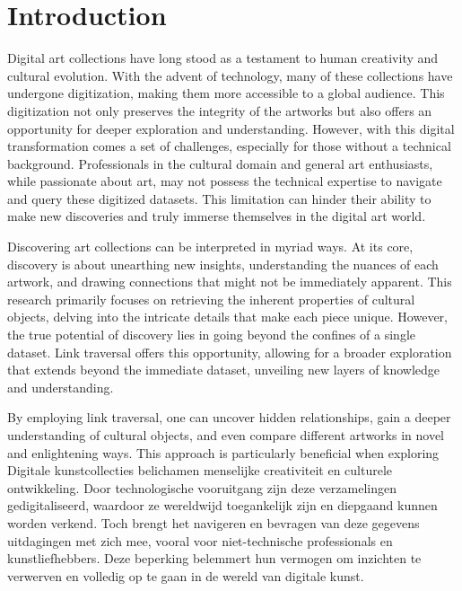 \chapter*{Introduction}

Digital art collections have long stood as a testament to human creativity and cultural evolution. With the advent of technology, many of these collections have undergone digitization, making them more accessible to a global audience. This digitization not only preserves the integrity of the artworks but also offers an opportunity for deeper exploration and understanding. However, with this digital transformation comes a set of challenges, especially for those without a technical background. Professionals in the cultural domain and general art enthusiasts, while passionate about art, may not possess the technical expertise to navigate and query these digitized datasets. This limitation can hinder their ability to make new discoveries and truly immerse themselves in the digital art world.

Discovering art collections can be interpreted in myriad ways. At its core, discovery is about unearthing new insights, understanding the nuances of each artwork, and drawing connections that might not be immediately apparent. This research primarily focuses on retrieving the inherent properties of cultural objects, delving into the intricate details that make each piece unique. However, the true potential of discovery lies in going beyond the confines of a single dataset. Link traversal offers this opportunity, allowing for a broader exploration that extends beyond the immediate dataset, unveiling new layers of knowledge and understanding.

By employing link traversal, one can uncover hidden relationships, gain a deeper understanding of cultural objects, and even compare different artworks in novel and enlightening ways. This approach is particularly beneficial when exploring Digitale kunstcollecties belichamen menselijke creativiteit en culturele ontwikkeling. Door technologische vooruitgang zijn deze verzamelingen gedigitaliseerd, waardoor ze wereldwijd toegankelijk zijn en diepgaand kunnen worden verkend. Toch brengt het navigeren en bevragen van deze gegevens uitdagingen met zich mee, vooral voor niet-technische professionals en kunstliefhebbers. Deze beperking belemmert hun vermogen om inzichten te verwerven en volledig op te gaan in de wereld van digitale kunst.

